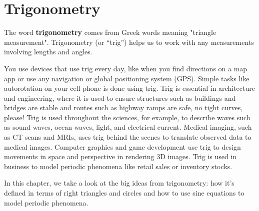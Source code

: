 \chapter{Trigonometry}

The word \textbf{trigonometry} comes from Greek words meaning "triangle measurement". Trigonometry (or ``trig'') helps us to work with any measurements involving lengths and angles. 

You use devices that use trig every day, like when you find directions on a map app or use any navigation or global positioning system (GPS). Simple tasks like autorotation on your cell phone is done using trig.  Trig is essential in architecture and engineering, where it is used to ensure structures such as buildings and bridges are stable and routes such as highway ramps are safe, no tight curves, please!  Trig is used throughout the sciences, for example, to describe waves such as sound waves, ocean waves, light, and electrical current.   Medical imaging, such as CT scans and MRIs, uses trig behind the scenes to translate observed data to medical images. Computer graphics and game development use trig to design movements in space and perspective in rendering 3D images. Trig is used in business to model periodic phenomena like retail sales or inventory stocks.

In this chapter, we take a look at the big ideas from trigonometry: how it's defined in terms of right triangles and circles and how to use sine equations to model periodic phenomena.